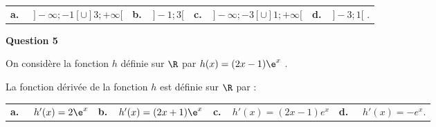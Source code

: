 \begin{tabularx}{\linewidth}{*{4}{X}}
\textbf{a.~~} $] -\infty ; -1[\cup ]3; +\infty[$ &\textbf{b.~~}$] -1 ; 3[ $&\textbf{c.~~}$] - \infty; -3[ \cup  ]1; +\infty[$& \textbf{d.~~}$] - 3 ; 1[$ .
\end{tabularx}


\medskip
\textbf{Question 5}
\medskip 

On considère la fonction $h$ définie sur $\R$ par $h(x) = (2x -1)\e^x$ .

La fonction dérivée de la fonction $h$ est définie sur $\R$ par :

\begin{tabularx}{\linewidth}{*{4}{X}}
\textbf{a.~~} $h'(x) = 2\e^x$  &\textbf{b.~~}$h'(x) = (2x + 1)\e^x$ &\textbf{c.~~}$ h'(x) = (2x -1)e^x$& \textbf{d.~~} $h'(x) = -e^x$.
\end{tabularx}

\vspace{1cm}
